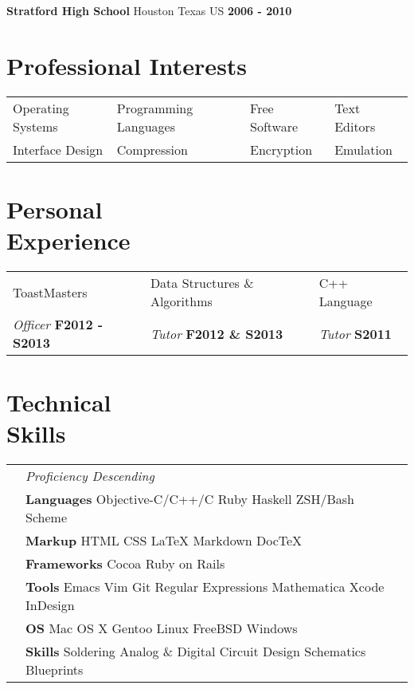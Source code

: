 \documentclass[margin,line]{res}
\begin{document}
{\begin{resume}
\vspace*{-.165in}
{\bf Stratford High School} Houston Texas US \hfill {\bf 2006 - 2010}\\

\vspace*{-.10in}
{\color{WildStrawberry}
  \section{\sc Professional Interests}}
\hspace{-.14in}
\vspace{-.10in}
\begin{tabular}{l l l l}
  Operating Systems & Programming Languages & Free Software & Text Editors \\
  Interface Design & Compression & Encryption & Emulation
\end{tabular}

\vspace*{.25in}
{\color{WildStrawberry}
  \section{\sc Personal \\ Experience}}
\color{black}
\hspace{-.13in}
\begin{tabular}{l l l}
  ToastMasters & Data Structures \& Algorithms & C++ Language \\
  {\em Officer} \bf F2012 - S2013 & {\em Tutor} \bf F2012 \& S2013         & {\em Tutor} \bf S2011 \\
\end{tabular}

\vspace*{.25in}
{\color{WildStrawberry}
  \vspace{-.10in}
  \section{\sc Technical \\ Skills}}
\hspace{-.35in}
{\renewcommand{\arraystretch}{1.25}
  \renewcommand{\tabcolsep}{0.175cm}
  \begin{tabular}{l l l}
    & {\em Proficiency Descending} & \\
    & {\bf Languages} Objective-C/C++/C Ruby Haskell ZSH/Bash Scheme \\
    & {\bf Markup} HTML CSS \LaTeX{} Markdown Doc\TeX{}\\
    & {\bf Frameworks} Cocoa  Ruby on Rails \\
    & {\bf Tools} Emacs Vim  Git  Regular Expressions Mathematica
    Xcode InDesign \\
    & {\bf OS} Mac OS X Gentoo Linux FreeBSD Windows \\
    & {\bf Skills} Soldering  Analog \& Digital Circuit Design  Schematics Blueprints\\
  \end{tabular}}



\end{resume}}
\end{document}

